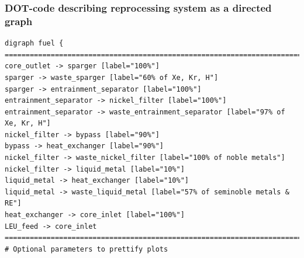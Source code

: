 \begin{frame}[fragile]
\frametitle{DOT-code describing reprocessing system as a directed graph}
\small
\begin{verbatim}
digraph fuel {
==============================================================================
core_outlet -> sparger [label="100%"]
sparger -> waste_sparger [label="60% of Xe, Kr, H"]
sparger -> entrainment_separator [label="100%"]
entrainment_separator -> nickel_filter [label="100%"]
entrainment_separator -> waste_entrainment_separator [label="97% of Xe, Kr, H"]
nickel_filter -> bypass [label="90%"]
bypass -> heat_exchanger [label="90%"]
nickel_filter -> waste_nickel_filter [label="100% of noble metals"]
nickel_filter -> liquid_metal [label="10%"]
liquid_metal -> heat_exchanger [label="10%"]
liquid_metal -> waste_liquid_metal [label="57% of seminoble metals & RE"]
heat_exchanger -> core_inlet [label="100%"]
LEU_feed -> core_inlet
==============================================================================
# Optional parameters to prettify plots
\end{verbatim}
\end{frame}